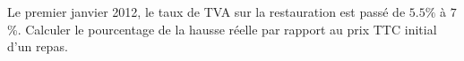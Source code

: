 
\begin{exercice}\label{exosmath-0152}

    Le premier janvier 2012, le taux de TVA sur la restauration est passé de \( 5.5\%\) à $7$\%. Calculer le pourcentage de la hausse réelle par rapport au prix TTC initial d'un repas.

\end{exercice}
